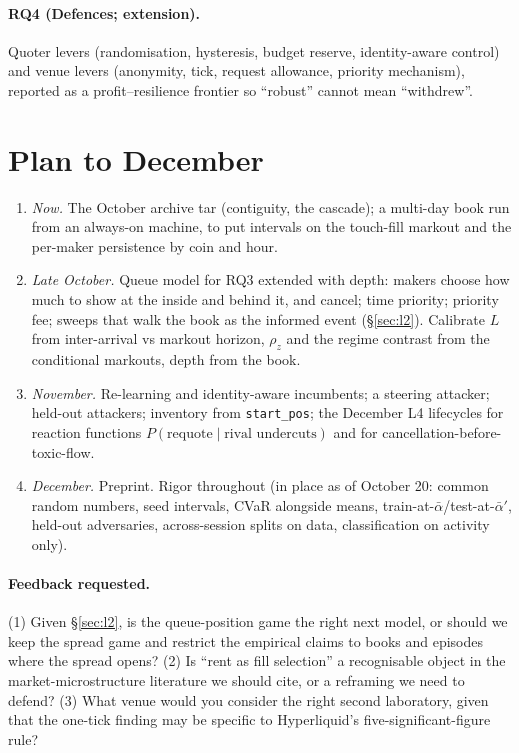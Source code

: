 \documentclass[11pt]{article}
\begin{document}
\paragraph{RQ4 (Defences; extension).} Quoter levers (randomisation, hysteresis, budget reserve, identity-aware control) and venue levers (anonymity, tick, request allowance, priority mechanism), reported as a profit--resilience frontier so ``robust'' cannot mean ``withdrew''.

\section{Plan to December}
\begin{enumerate}
\item \emph{Now.} The October archive tar (contiguity, the cascade); a multi-day book run from an always-on machine, to put intervals on the touch-fill markout and the per-maker persistence by coin and hour.
\item \emph{Late October.} Queue model for RQ3 extended with depth: makers choose how much to show at the inside and behind it, and cancel; time priority; priority fee; sweeps that walk the book as the informed event (\S\ref{sec:l2}). Calibrate $L$ from inter-arrival vs markout horizon, $\rho_z$ and the regime contrast from the conditional markouts, depth from the book.
\item \emph{November.} Re-learning and identity-aware incumbents; a steering attacker; held-out attackers; inventory from \texttt{start\_pos}; the December L4 lifecycles for reaction functions $P(\text{requote}\mid\text{rival undercuts})$ and for cancellation-before-toxic-flow.
\item \emph{December.} Preprint. Rigor throughout (in place as of October 20: common random numbers, seed intervals, CVaR alongside means, train-at-$\bar\alpha$/test-at-$\bar\alpha'$, held-out adversaries, across-session splits on data, classification on activity only).
\end{enumerate}

\paragraph{Feedback requested.} (1) Given \S\ref{sec:l2}, is the queue-position game the right next model, or should we keep the spread game and restrict the empirical claims to books and episodes where the spread opens? (2) Is ``rent as fill selection'' a recognisable object in the market-microstructure literature we should cite, or a reframing we need to defend? (3) What venue would you consider the right second laboratory, given that the one-tick finding may be specific to Hyperliquid's five-significant-figure rule?
\end{document}
